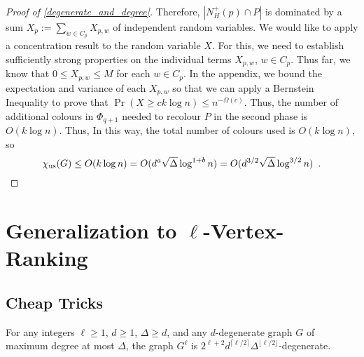 \documentclass{patmorin}
\newcommand{\trn}{\chi_{\mathrm{us}}}
\begin{document}
\begin{proof}[Proof of \cref{degenerate_and_degree}]
  Therefore, $|N_H^+(p)\cap P|$ is dominated by a sum $X_p:=\sum_{w\in C_p} X_{p,w}$ of independent random variables.  We would like to apply a concentration result to the random variable $X$.  For this, we need to  establish sufficiently strong properties on the individual terms $X_{p,w}$, $w\in C_p$.  Thus far, we know that $0\le X_{p,w}\le M$ for each $w\in C_p$. In the appendix, we bound the expectation and variance of each $X_{p,w}$ so that we can apply a Bernstein Inequality to prove that $\Pr(X\ge ck\log n)\le n^{-\Omega(c)}$.  Thus, the number of additional colours in $\Phi_{q+1}$ needed to recolour $P$ in the second phase is $O(k\log n)$.  Thus, In this way, the total number of colours used is $O(k\log n)$, so
  \[
    \trn(G) \le O(k \log n) = O(d^a\sqrt{\Delta}\log^{1+b} n) = O(d^{3/2}\sqrt{\Delta}\log^{3/2} n) \enspace . \qedhere
  \]
\end{proof}


\section{Generalization to \boldmath$\ell$-Vertex-Ranking}

\subsection{Cheap Tricks}

\begin{lem}\label{cairns_trick}
  For any integers $\ell\ge 1$, $d\ge 1$, $\Delta\ge d$, and any $d$-degenerate graph $G$ of maximum degree at most $\Delta$, the graph $G^{\ell}$ is $2^{\ell+2} d^{\lceil\ell/2\rceil}\Delta^{\lfloor\ell/2\rfloor}$-degenerate.
\end{lem}
\end{document}
